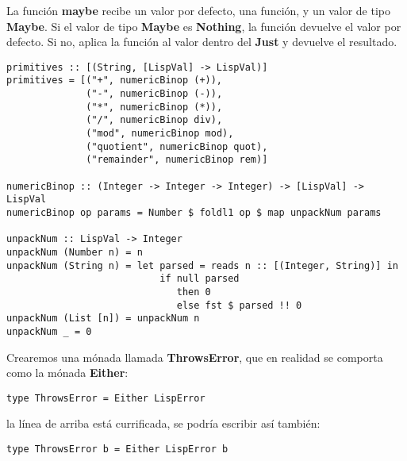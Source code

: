 La funci\'on \textbf{maybe} recibe un valor por defecto, una funci\'on, y un valor de tipo \textbf{Maybe}. Si el valor de tipo \textbf{Maybe} es \textbf{Nothing}, la funci\'on devuelve el valor por defecto. Si no, aplica la funci\'on al valor dentro del \textbf{Just} y devuelve el resultado.\\

\begin{minipage}{\linewidth}
\begin{footnotesize}
\begin{lstlisting}[frame=single]
primitives :: [(String, [LispVal] -> LispVal)]
primitives = [("+", numericBinop (+)),
              ("-", numericBinop (-)),
              ("*", numericBinop (*)),
              ("/", numericBinop div),
              ("mod", numericBinop mod),
              ("quotient", numericBinop quot),
              ("remainder", numericBinop rem)]

numericBinop :: (Integer -> Integer -> Integer) -> [LispVal] -> LispVal
numericBinop op params = Number $ foldl1 op $ map unpackNum params
 
unpackNum :: LispVal -> Integer
unpackNum (Number n) = n
unpackNum (String n) = let parsed = reads n :: [(Integer, String)] in 
                           if null parsed 
                              then 0
                              else fst $ parsed !! 0
unpackNum (List [n]) = unpackNum n
unpackNum _ = 0
\end{lstlisting}
\end{footnotesize}
\end{minipage}

Crearemos una m\'onada llamada \textbf{ThrowsError}, que en realidad se comporta como la m\'onada \textbf{Either}:\\

\begin{minipage}{\linewidth}
\begin{small}
\begin{lstlisting}[frame=single]
type ThrowsError = Either LispError
\end{lstlisting}
\end{small}
\end{minipage}

la l\'inea de arriba est\'a currificada, se podr\'ia escribir as\'i tambi\'en:\\

\begin{minipage}{\linewidth}
\begin{small}
\begin{lstlisting}[frame=single]
type ThrowsError b = Either LispError b
\end{lstlisting}
\end{small}
\end{minipage}

